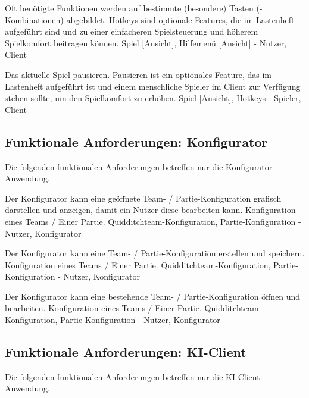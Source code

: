         {Oft benötigte Funktionen werden auf bestimmte (besondere) Tasten (-Kombinationen) abgebildet.}
        {Hotkeys sind optionale Features, die im Lastenheft aufgeführt sind und zu einer einfacheren Spielsteuerung und höherem Spielkomfort beitragen können.}
        {Spiel [Ansicht], Hilfemenü [Ansicht]}
        {-}
        {Nutzer, Client}
        
        {Das aktuelle Spiel pausieren.}
        {Pausieren ist ein optionales Feature, das im Lastenheft aufgeführt ist und einem menschliche Spieler im Client zur Verfügung stehen sollte, um den Spielkomfort zu erhöhen.}
        {Spiel [Ansicht], Hotkeys}
        {-}
        {Spieler, Client}
        

\subsection{Funktionale Anforderungen: Konfigurator}
    
Die folgenden funktionalen Anforderungen betreffen nur die Konfigurator Anwendung.

        {Der Konfigurator kann eine geöffnete Team- / Partie-Konfiguration grafisch darstellen und anzeigen, damit ein Nutzer diese bearbeiten kann.}
        {Konfiguration eines Teams / Einer Partie.}
        {Quidditchteam-Konfiguration, Partie-Konfiguration}
        {-}
        {Nutzer, Konfigurator}	

        {Der Konfigurator kann eine Team- / Partie-Konfiguration erstellen und speichern.}
        {Konfiguration eines Teams / Einer Partie.}
        {Quidditchteam-Konfiguration, Partie-Konfiguration}
        {-}
        {Nutzer, Konfigurator}	

        {Der Konfigurator kann eine bestehende Team- / Partie-Konfiguration öffnen und bearbeiten.}
        {Konfiguration eines Teams / Einer Partie.}
        {Quidditchteam-Konfiguration, Partie-Konfiguration}
        {-}
        {Nutzer, Konfigurator}
        
\subsection{Funktionale Anforderungen: KI-Client}

Die folgenden funktionalen Anforderungen betreffen nur die KI-Client Anwendung.

